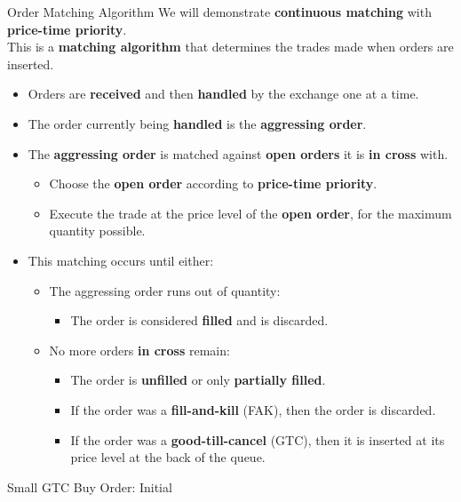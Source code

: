 \begin{frame}{Order Matching Algorithm}
  We will demonstrate \textbf{continuous matching} with \textbf{price-time priority}.\\
  This is a \textbf{matching algorithm} that determines the trades made when orders are inserted.

  \begin{itemize}
    \item Orders are \textbf{received} and then \textbf{handled} by the exchange one at a time.
    \item The order currently being \textbf{handled} is the \textbf{aggressing order}.
    \item The \textbf{aggressing order} is matched against \textbf{open orders} it is \textbf{in cross} with.
    \begin{itemize}
      \item Choose the \textbf{open order} according to \textbf{price-time priority}.
      \item Execute the trade at the price level of the \textbf{open order}, for the maximum quantity possible.
    \end{itemize}
    \item This matching occurs until either:
    \begin{itemize}
      \item The aggressing order runs out of quantity:
      \begin{itemize}
        \item The order is considered \textbf{filled} and is discarded.
      \end{itemize}
      \item No more orders \textbf{in cross} remain:
      \begin{itemize}
        \item The order is \textbf{unfilled} or only \textbf{partially filled}.
        \item If the order was a \textbf{fill-and-kill} (FAK), then the order is discarded.
        \item If the order was a \textbf{good-till-cancel} (GTC), then it is inserted at its price level at the back of the queue.
      \end{itemize}
    \end{itemize}
  \end{itemize}
\end{frame}

\begin{frame}{Small GTC Buy Order: Initial}
  \begin{center}
    
  \end{center}
\end{frame}

